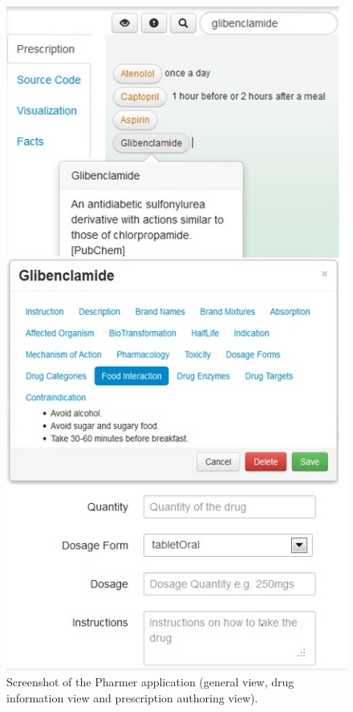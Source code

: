 \documentclass[journal]{IEEEtran}
\begin{document}
\begin{figure}[tb]
	\centering
		\includegraphics[width=0.95\columnwidth]{images/screenshot.jpg}
	\caption{Screenshot of the Pharmer application (general view, drug information view and prescription authoring view).}
	\label{fig:screenshot}
\end{figure}
\end{document}

